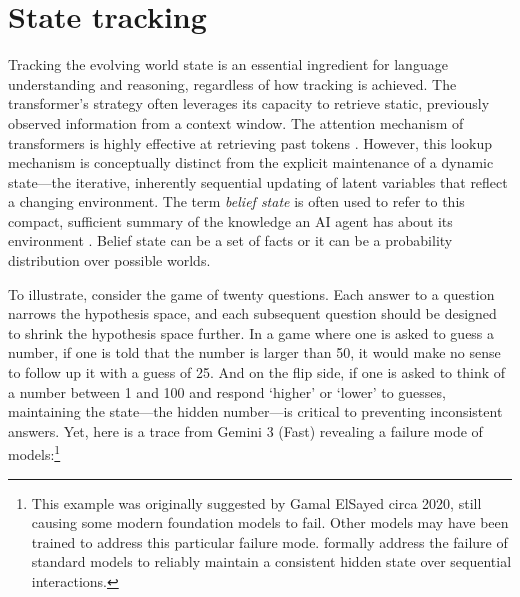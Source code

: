 \documentclass{llmxive}
\begin{document}
\section{State tracking}

Tracking the evolving world state is an essential ingredient for 
language understanding and 
reasoning, regardless of how tracking is achieved. The transformer's 
strategy often leverages its capacity to retrieve static, previously 
observed information from a context window. The attention mechanism of 
transformers is highly effective at retrieving past tokens \citep{olsson2022context}.
However,
this lookup mechanism is conceptually distinct from the explicit maintenance
of a dynamic state---the iterative, inherently sequential updating of 
latent variables that reflect a changing environment. The term 
\emph{belief state} is often used to refer to this compact, sufficient 
summary of the knowledge an AI agent has about its environment \citep{Chrisman1992,kaelbling1998planning}.
Belief state can be a set of facts or it can be a probability distribution over possible worlds.

To illustrate, consider the game of twenty questions. Each answer to a question
narrows the hypothesis space, and each subsequent question should be designed
to shrink the hypothesis space further. In a game where one is asked to
guess a number, if one is told that the number is larger than 50, it would 
make no sense to follow up it with a guess of 25. And on the flip side, 
if one is asked to think of a number between 1 and 100 and respond `higher'
or `lower' to guesses, maintaining the state---the hidden number---is critical 
to preventing inconsistent answers. Yet, here is a trace from Gemini 3 (Fast)
revealing a failure mode of models:\footnote{This example was originally suggested
by Gamal ElSayed circa 2020, still causing some modern foundation models to fail. Other models may have been trained to address this particular failure mode. 
\citet{baldelli2026} formally address the failure of standard models to reliably maintain a consistent hidden state over sequential interactions.}
\end{document}
